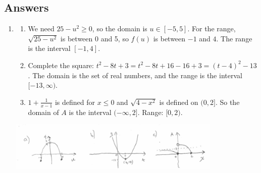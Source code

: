 \newpage\subsection*{Answers}

\SolutionsStatement

\begin{enumerate}
	
    \item 
    \begin{enumerate}
    	\item We need $25-u^2 \ge 0$, so the domain is $u \in [-5,5]$. For the range, $\sqrt{25-u^2}$ is between 0 and 5, so $f(u)$ is between $-1$ and $4$. The range is the interval $[-1,4]$. 
        \item Complete the square: $t^2 - 8t +3 = t^2 - 8t +16 - 16 +3 = (t-4)^2 - 13$. The domain is the set of real numbers, and the range is the interval $[-13,\infty)$.
        \item $1+\frac{1}{x - 1}$ is defined for $x \le 0$ and $\sqrt{4 - x^2}$ is defined on $(0,2]$. So the domain of $A$ is the interval $(-\infty,2]$. Range: $[0,2)$. 
    \end{enumerate}

	\begin{center}
		\includegraphics[width=0.8\textwidth]{images/imgWS1Spring17.png} 
	\end{center}


\end{enumerate}
